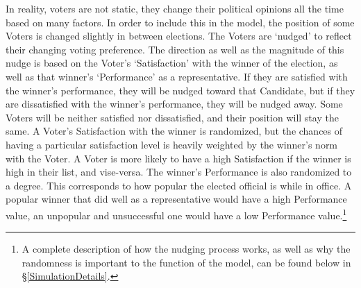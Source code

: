 \documentclass[12pt]{article}
\begin{document}
\qquad In reality, voters are not static, they change their political opinions all the time based on many factors. In order to include this in the model, the position of some Voters is changed slightly in between elections. The Voters are `nudged' to reflect their changing voting preference. The direction as well as the magnitude of this nudge is based on the Voter's `Satisfaction' with the winner of the election, as well as that winner's `Performance' as a representative. If they are satisfied with the winner's performance, they will be nudged toward that Candidate, but if they are dissatisfied with the winner's performance, they will be nudged away. Some Voters will be neither satisfied nor dissatisfied, and their position will stay the same. A Voter's Satisfaction with the winner is randomized, but the chances of having a particular satisfaction level is heavily weighted by the winner's norm with the Voter. A Voter is more likely to have a high Satisfaction if the winner is high in their list, and vise-versa. The winner's Performance is also randomized to a degree. This corresponds to how popular the elected official is while in office. A popular winner that did well as a representative would have a high Performance value, an unpopular and unsuccessful one would have a low Performance value.\footnote{A complete description of how the nudging process works, as well as why the randomness is important to the function of the model, can be found below in \S \ref{SimulationDetails}.} \\

\end{document}
